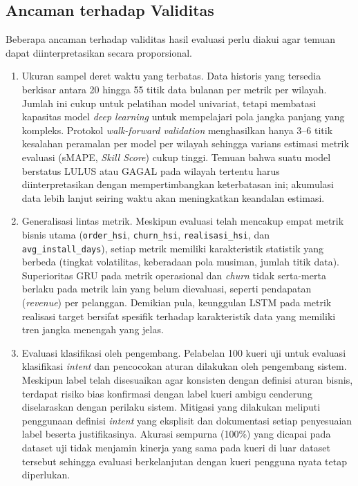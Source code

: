 \subsection{Ancaman terhadap Validitas}
\label{sec:threats-validity}

Beberapa ancaman terhadap validitas hasil evaluasi perlu diakui agar temuan dapat diinterpretasikan secara proporsional.

\begin{enumerate}
    \item Ukuran sampel deret waktu yang terbatas.
    Data historis yang tersedia berkisar antara 20 hingga 55 titik data bulanan per metrik per wilayah. Jumlah ini cukup untuk pelatihan model univariat, tetapi membatasi kapasitas model \textit{deep learning} untuk mempelajari pola jangka panjang yang kompleks. Protokol \textit{walk-forward va\-li\-da\-tion} menghasilkan hanya 3--6 titik kesalahan peramalan per model per wilayah sehingga varians estimasi metrik evaluasi (sMAPE, \textit{Skill Score}) cukup tinggi. Temuan bahwa suatu model berstatus LULUS atau GAGAL pada wilayah tertentu harus diinterpretasikan dengan mempertimbangkan keterbatasan ini; akumulasi data lebih lanjut seiring waktu akan meningkatkan keandalan estimasi.

    \item Generalisasi lintas metrik.
    Meskipun evaluasi telah mencakup empat metrik bisnis utama (\texttt{order\_}\allowbreak\texttt{hsi}, \allowbreak\texttt{churn\_}\allowbreak\texttt{hsi}, \allowbreak\texttt{realisasi\_}\allowbreak\texttt{hsi}, \allowbreak dan \texttt{avg\_}\allowbreak\texttt{install\_}\allowbreak\texttt{days}), setiap metrik memiliki karakteristik statistik yang berbeda (tingkat volatilitas, keberadaan pola musiman, jumlah titik data). Superioritas GRU pada metrik operasional dan \textit{churn} tidak serta-merta berlaku pada metrik lain yang belum dievaluasi, seperti pendapatan (\textit{revenue}) per pelanggan. Demikian pula, keunggulan LSTM pada metrik realisasi target bersifat spesifik terhadap karakteristik data yang memiliki tren jangka menengah yang jelas.

    \item Evaluasi klasifikasi oleh pengembang.
    Pelabelan 100 kueri uji untuk evaluasi klasifikasi \textit{intent} dan pencocokan aturan dilakukan oleh pengembang sistem. Meskipun label telah disesuaikan agar konsisten dengan definisi aturan bisnis, terdapat risiko bias konfirmasi dengan label kueri ambigu cenderung diselaraskan dengan perilaku sistem. Mitigasi yang dilakukan meliputi penggunaan definisi \textit{intent} yang eksplisit dan dokumentasi setiap penyesuaian label beserta justifikasinya. Akurasi sempurna (100\%) yang dicapai pada dataset uji tidak menjamin kinerja yang sama pada kueri di luar dataset tersebut sehingga evaluasi berkelanjutan dengan kueri pengguna nyata tetap diperlukan.


\end{enumerate}
